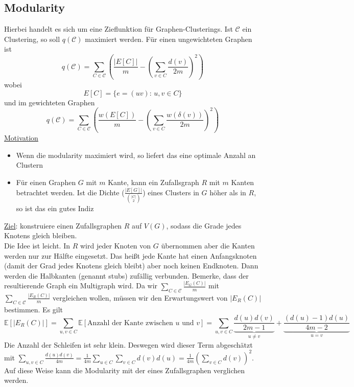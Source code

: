 \documentclass[a4paper, 12pt]{article}
\theoremstyle{plain}
\theoremstyle{definition}
\theoremstyle{lemma}
\theoremstyle{remark}
\theoremstyle{corollary}
\theoremstyle{example}
\begin{document}
	\subsection{Modularity}
	Hierbei handelt es sich um eine Zieflunktion für Graphen-Clusterings. Ist $\mathcal{C}$ ein Clustering, so soll $q(\mathcal{C})$ maximiert werden. Für einen ungewichteten Graphen ist \[q(\mathcal{C}) = \sum_{C \in \mathcal{C}} \left(\frac{\left|E[C]\right|}{m} - \left(\sum_{v \in C} \frac{d(v)}{2m}\right)^2\right)\] wobei \[E[C] = \{e=(uv): \, u,v \in C\}\] und im gewichteten Graphen \[q(\mathcal{C}) = \sum_{C \in \mathcal{C}} \left(\frac{w(E[C])}{m} - \left(\sum_{v \in C} \frac{w(\delta(v))}{2m}\right)^2\right)\]
	\underline{Motivation}
	\begin{itemize}
		\item Wenn die modularity maximiert wird, so liefert das eine optimale Anzahl an Clustern
		\item Für einen Graphen $G$ mit $m$ Kante, kann ein Zufallsgraph $R$ mit $m$ Kanten betrachtet werden. Ist die Dichte ($\frac{\left|E[G]\right|}{\binom{\left|C\right|}{2}}$) eines Clusters in $G$ höher als in $R$, so ist das ein gutes Indiz
	\end{itemize}
	\underline{Ziel}: konstruiere einen Zufallsgraphen $R$ auf $V(G)$, sodass die Grade jedes Knotens gleich bleiben.\\
	Die Idee ist leicht. In $R$ wird jeder Knoten von $G$ übernommen aber die Kanten werden nur zur Hälfte eingesetzt. Das heißt jede Kante hat einen Anfangsknoten (damit der Grad jedes Knotens gleich bleibt) aber noch keinen Endknoten. Dann werden die Halbkanten (genannt stubs) zufällig verbunden. Bemerke, dass der resultierende Graph ein Multigraph wird. Da wir $\sum_{C \in \mathcal{C}} \frac{\left|E_G(C)\right|}{m}$ mit $\sum_{C \in \mathcal{C}} \frac{\left|E_R(C)\right|}{m}$ vergleichen wollen, müssen wir den Erwartungswert von $\left|E_R(C)\right|$ bestimmen. Es gilt \[\mathbb{E}[\left|E_R(C)\right|] = \sum_{u,v \in C} \mathbb{E}[\text{Anzahl der Kante zwischen $u$ und $v$}] = \sum_{u,v \in C} \underbrace{\frac{d(u)d(v)}{2m-1}}_{u \neq v} + \underbrace{\frac{(d(u)-1)d(u)}{4m-2}}_{u=v}\]
	Die Anzahl der Schleifen ist sehr klein. Deswegen wird dieser Term abgeschätzt mit $\sum_{u,v \in C}\frac{d(u)d(v)}{4m} = \frac{1}{4m} \sum_{u \in C} \sum_{v \in C} d(v)d(u)= \frac{1}{4m} \left(\sum_{v \in C} d(v)\right)^2$. Auf diese Weise kann die Modularity mit der eines Zufallsgraphen verglichen werden.
\end{document}
